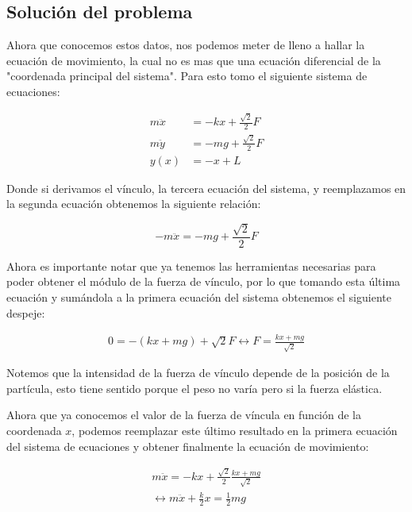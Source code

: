 \documentclass{article}
\begin{document}
\begin{multicols}{2}
\section{Solución del problema}
Ahora que conocemos estos datos, nos podemos meter de lleno a hallar la ecuación de movimiento, la cual no es mas que una ecuación diferencial de la "coordenada principal del sistema". Para esto tomo el siguiente sistema de ecuaciones:

\begin{equation}
\begin{split}
    m\ddot{x} &= -kx + \frac{\sqrt{2}}{2}F \\
    m\ddot{y} &= -mg + \frac{\sqrt{2}}{2}F \\
    y(x) &= -x + L
\end{split}
\end{equation}

Donde si derivamos el vínculo, la tercera ecuación del sistema, y reemplazamos en la segunda ecuación obtenemos la siguiente relación:

\begin{equation}
    -m\ddot{x} = -mg + \frac{\sqrt{2}}{2}F
\end{equation}

Ahora es importante notar que ya tenemos las herramientas necesarias para poder obtener el módulo de la fuerza de vínculo, por lo que tomando esta última ecuación y sumándola a la primera ecuación del sistema obtenemos el siguiente despeje:

\begin{equation}
\begin{split}
    0 = -(kx + mg) + \sqrt{2}F
    \leftrightarrow F = \frac{kx + mg}{\sqrt{2}}
\end{split}
\end{equation}

Notemos que la intensidad de la fuerza de vínculo depende de la posición de la partícula, esto tiene sentido porque el peso no varía pero si la fuerza elástica.

Ahora que ya conocemos el valor de la fuerza de víncula en función de la coordenada $x$, podemos reemplazar este último resultado en la primera ecuación del sistema de ecuaciones y obtener finalmente la ecuación de movimiento:

\begin{equation}
    \begin{split}
        m\ddot{x} = -kx + \frac{\sqrt{2}}{2}\frac{kx + mg}{\sqrt{2}} \\
        \leftrightarrow m\ddot{x} + \frac{k}{2}x = \frac{1}{2}mg
    \end{split}
\end{equation}


\end{multicols}
\end{document}
